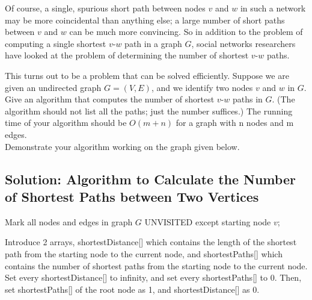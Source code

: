 \documentclass[letter,11pt]{article}
\begin{document}
Of course, a single, spurious short path between nodes $v$ and $w$ in such a network may be more coincidental than anything else; a large number of short paths between $v$ and $w$ can be much more convincing.  So in addition to the problem of computing a single shortest $v$-$w$ path in a graph $G$, social networks researchers have looked at the problem of determining the number of shortest $v$-$w$ paths.


This turns out to be a problem that can be solved efficiently. Suppose we are given an undirected graph $G = (V, E)$, and we identify two nodes $v$ and $w$ in $G$. Give an algorithm that computes the number of shortest $v$-$w$ paths in $G$. (The algorithm should not list all the paths; just the number suffices.) The running time of your algorithm should be $O(m + n)$ for a graph with n nodes and m edges.  \\

Demonstrate your algorithm working on the graph given below.

\begin{center}
\end{center}

\subsection{Solution: Algorithm to Calculate the Number of Shortest Paths between Two Vertices}

\indent \indent Mark all nodes and edges in graph $G$ UNVISITED except starting node $v$;

\indent Introduce 2 arrays, shortestDistance[] which contains the length of the shortest path from the starting node to the current node, and shortestPaths[] which contains the number of shortest paths from the starting node to the current node. Set every shortestDistance[] to infinity, and set every shortestPaths[] to 0. Then, set shortestPaths[] of the root node as 1, and shortestDistance[] as 0.
\end{document}

